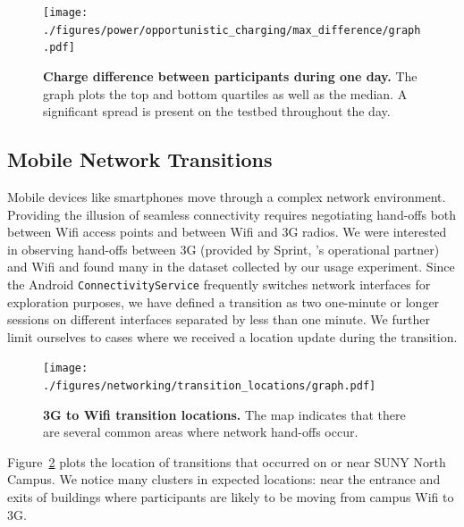 \begin{figure}[th!]
\centering
\texttt{[image: ./figures/power/opportunistic\_charging/max\_difference/graph.pdf]}
\caption{\textbf{Charge difference between participants during one day.} The
graph plots the top and bottom quartiles as well as the median. A significant
spread is present on the testbed throughout the day.}
\label{fig-opportunisticspread}
\end{figure}

\subsection{Mobile Network Transitions}
\label{subsec-networktransitions}

Mobile devices like smartphones move through a complex network environment.
Providing the illusion of seamless connectivity requires negotiating hand-offs
both between Wifi access points and between Wifi and 3G radios. We were
interested in observing hand-offs between 3G (provided by Sprint, \PhoneLab{}'s
operational partner) and Wifi and found many in the dataset collected by our
usage experiment. Since the Android \texttt{ConnectivityService} frequently
switches network interfaces for exploration purposes, we have defined a
transition as two one-minute or longer sessions on different interfaces
separated by less than one minute. We further limit ourselves to cases where we
received a location update during the transition.

\begin{figure}[th!]
\centering
\texttt{[image: ./figures/networking/transition\_locations/graph.pdf]}
\caption{\textbf{3G to Wifi transition locations.} The map indicates that
there are several common areas where network hand-offs occur.}
\label{figure-networktransitions}
\end{figure}

Figure~\ref{figure-networktransitions} plots the location of transitions that
occurred on or near SUNY North Campus. We notice many clusters in expected
locations: near the entrance and exits of buildings where participants are
likely to be moving from campus Wifi to 3G.
